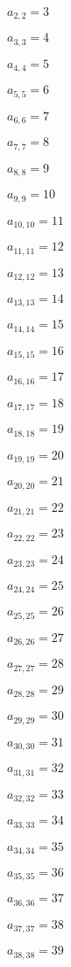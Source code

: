 \documentclass[a4paper,12pt]{article}
\begin{document}
$a _{ 2, 2 } = 3$

$a _{ 3, 3 } = 4$

$a _{ 4, 4 } = 5$

$a _{ 5, 5 } = 6$

$a _{ 6, 6 } = 7$

$a _{ 7, 7 } = 8$

$a _{ 8, 8 } = 9$

$a _{ 9, 9 } = 10$

$a _{ 10, 10 } = 11$

$a _{ 11, 11 } = 12$

$a _{ 12, 12 } = 13$

$a _{ 13, 13 } = 14$

$a _{ 14, 14 } = 15$

$a _{ 15, 15 } = 16$

$a _{ 16, 16 } = 17$

$a _{ 17, 17 } = 18$

$a _{ 18, 18 } = 19$

$a _{ 19, 19 } = 20$

$a _{ 20, 20 } = 21$

$a _{ 21, 21 } = 22$

$a _{ 22, 22 } = 23$

$a _{ 23, 23 } = 24$

$a _{ 24, 24 } = 25$

$a _{ 25, 25 } = 26$

$a _{ 26, 26 } = 27$

$a _{ 27, 27 } = 28$

$a _{ 28, 28 } = 29$

$a _{ 29, 29 } = 30$

$a _{ 30, 30 } = 31$

$a _{ 31, 31 } = 32$

$a _{ 32, 32 } = 33$

$a _{ 33, 33 } = 34$

$a _{ 34, 34 } = 35$

$a _{ 35, 35 } = 36$

$a _{ 36, 36 } = 37$

$a _{ 37, 37 } = 38$

$a _{ 38, 38 } = 39$
\end{document}
